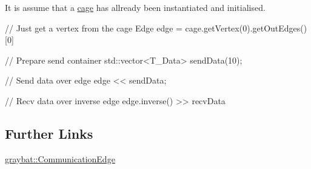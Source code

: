 It is assume that a \hyperlink{cage}{cage} has allready been instantiated and initialised.


\begin{DoxyCode}
\textcolor{comment}{// Just get a vertex from the cage}
Edge edge = cage.getVertex(0).getOutEdges()[0]

\textcolor{comment}{// Prepare send container}
std::vector<T\_Data> sendData(10);

\textcolor{comment}{// Send data over edge}
edge << sendData;

\textcolor{comment}{// Recv data over inverse edge}
edge.inverse() >> recvData
\end{DoxyCode}


\subsection*{Further Links}


\begin{DoxyItemize}
\item \hyperlink{structgraybat_1_1CommunicationEdge}{graybat\+::\+Communication\+Edge} 
\end{DoxyItemize}